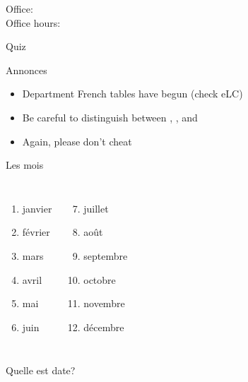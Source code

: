 \documentclass{beamer}
\subtitle[Dates]{Les dates importantes}
\begin{document}
  \begin{frame}
    \titlepage
    \tiny{Office: \\
          Office hours: }
  \end{frame}

  \begin{frame}{}
    \begin{center}
      \Large Quiz
    \end{center}
  \end{frame}

  \begin{frame}{Annonces}
    \begin{itemize}
      \item Department French tables have begun (check eLC)
      \item Be careful to distinguish between , , and 
      \item Again, please don't cheat
    \end{itemize}
  \end{frame}

  \begin{frame}{Les mois}
    \begin{columns}
        \begin{enumerate}
          \item janvier
          \item février
          \item mars
          \item avril
          \item mai
          \item juin
        \end{enumerate}
        \begin{enumerate}
          \setcounter{enumi}{6}
          \item juillet
          \item août
          \item septembre
          \item octobre
          \item novembre
          \item décembre
        \end{enumerate}
    \end{columns}
    \vspace{1cm}
    Quelle est date? \underline{}
  \end{frame}
\end{document}
